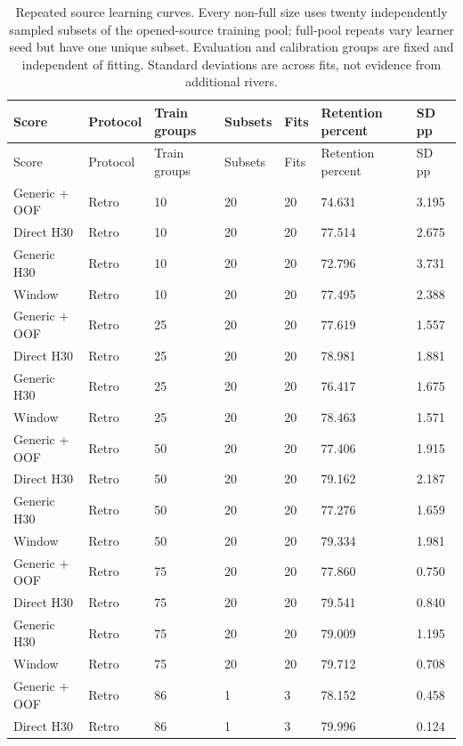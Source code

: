{\tabletext
\setlength{\tabcolsep}{3pt}
\begin{longtable}{p{}p{}p{}p{}p{}p{}p{}}
\caption{Repeated source learning curves. Every non-full size uses twenty independently sampled subsets of the opened-source training pool; full-pool repeats vary learner seed but have one unique subset. Evaluation and calibration groups are fixed and independent of fitting. Standard deviations are across fits, not evidence from additional rivers.}\label{tab:r3si-learning}\\
\toprule
Score & Protocol & Train groups & Subsets & Fits & Retention percent & SD pp \\
\midrule
\endfirsthead
\toprule
Score & Protocol & Train groups & Subsets & Fits & Retention percent & SD pp \\
\midrule
\endhead
Generic + OOF & Retro & 10 & 20 & 20 & 74.631 & 3.195 \\
Direct H30 & Retro & 10 & 20 & 20 & 77.514 & 2.675 \\
Generic H30 & Retro & 10 & 20 & 20 & 72.796 & 3.731 \\
Window & Retro & 10 & 20 & 20 & 77.495 & 2.388 \\
Generic + OOF & Retro & 25 & 20 & 20 & 77.619 & 1.557 \\
Direct H30 & Retro & 25 & 20 & 20 & 78.981 & 1.881 \\
Generic H30 & Retro & 25 & 20 & 20 & 76.417 & 1.675 \\
Window & Retro & 25 & 20 & 20 & 78.463 & 1.571 \\
Generic + OOF & Retro & 50 & 20 & 20 & 77.406 & 1.915 \\
Direct H30 & Retro & 50 & 20 & 20 & 79.162 & 2.187 \\
Generic H30 & Retro & 50 & 20 & 20 & 77.276 & 1.659 \\
Window & Retro & 50 & 20 & 20 & 79.334 & 1.981 \\
Generic + OOF & Retro & 75 & 20 & 20 & 77.860 & 0.750 \\
Direct H30 & Retro & 75 & 20 & 20 & 79.541 & 0.840 \\
Generic H30 & Retro & 75 & 20 & 20 & 79.009 & 1.195 \\
Window & Retro & 75 & 20 & 20 & 79.712 & 0.708 \\
Generic + OOF & Retro & 86 & 1 & 3 & 78.152 & 0.458 \\
Direct H30 & Retro & 86 & 1 & 3 & 79.996 & 0.124 \\

\end{longtable}}

